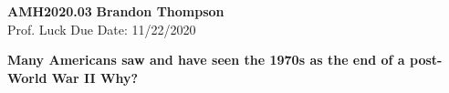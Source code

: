 \noindent
\textbf{AMH2020.03} \hfill \textbf{Brandon Thompson} \\
\normalsize Prof. Luck \hfill Due Date: 11/22/2020 \\

\begin{center}
\textbf{Many Americans saw and have seen the 1970s as the end of a post-World War II  Why?}
\end{center}